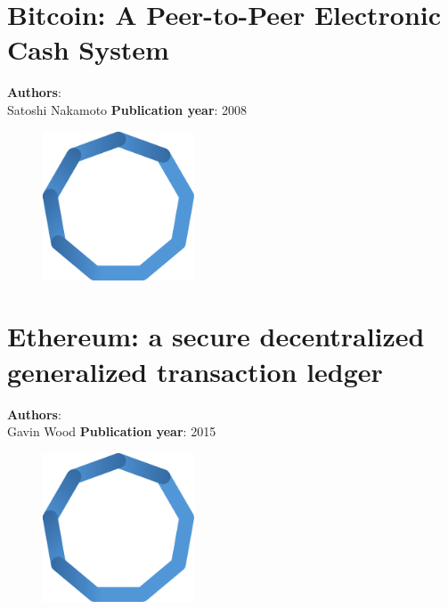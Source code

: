 \documentclass[11pt,fleqn]{book} %
\begin{document}
\chapter{Bitcoin: A Peer-to-Peer Electronic Cash System}
\vspace*{-7mm}
\Large \textbf{Authors}: \\
Satoshi Nakamoto
\newline\newline
\textbf{Publication year}: 2008
\begin{figure}[b]
    \centering
    \includegraphics[width=0.4\textwidth]{distributed-systems-blue.pdf}
\end{figure}


\chapter{Ethereum: a secure decentralized generalized transaction ledger}
\vspace*{-7mm}
\Large \textbf{Authors}: \\
Gavin Wood
\newline\newline
\textbf{Publication year}: 2015
\begin{figure}[b]
    \centering
    \includegraphics[width=0.4\textwidth]{distributed-systems-blue.pdf}
\end{figure}

\end{document}
